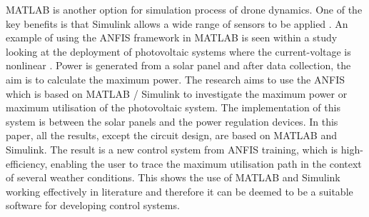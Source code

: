 MATLAB is another option for simulation process of drone dynamics. One of the key benefits is that Simulink allows a wide range of sensors to be applied \cite{roy1}. An example of using the ANFIS framework in MATLAB is seen within a study looking at the deployment of photovoltaic systems where the current-voltage is nonlinear \cite{roy6}. Power is generated from a solar panel and after data collection, the aim is to calculate the maximum power. The research aims to use the ANFIS which is based on MATLAB / Simulink to investigate the maximum power or maximum utilisation of the photovoltaic system. The implementation of this system is between the solar panels and the power regulation devices. In this paper, all the results, except the circuit design, are based on MATLAB and Simulink. The result is a new control system from ANFIS training, which is high-efficiency, enabling the user to trace the maximum utilisation path in the context of several weather conditions. This shows the use of MATLAB and Simulink working effectively in literature and therefore it can be deemed to be a suitable software for developing control systems.
